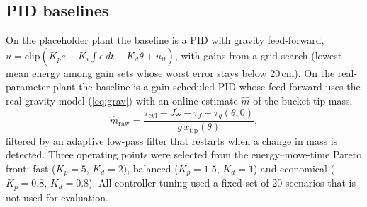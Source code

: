 \subsection{PID baselines}
\label{sec:baselines}
On the placeholder plant the baseline is a PID with gravity feed-forward,
$u=\mathrm{clip}(K_p e + K_i\!\int\! e\,dt - K_d\dot\theta + u_\mathrm{ff})$, with gains from a grid
search (lowest mean energy among gain sets whose worst error stays below 20\,cm).
On the real-parameter plant the baseline is a gain-scheduled PID whose feed-forward uses the
real gravity model (\ref{eq:grav}) with an online estimate $\hat m$ of the bucket tip mass,
\begin{equation}
\hat m_\mathrm{raw} = \frac{\tau_\mathrm{cyl} - J\dot\omega - \tau_f - \tau_g(\theta,0)}{g\,x_\mathrm{tip}(\theta)},
\label{eq:mhat}
\end{equation}
filtered by an adaptive low-pass filter that restarts when a change in mass is detected.
Three operating points were selected from the energy--move-time Pareto front:
fast ($K_p=5$, $K_d=2$), balanced ($K_p=1.5$, $K_d=1$) and economical ($K_p=0.8$, $K_d=0.8$).
All controller tuning used a fixed set of 20 scenarios that is not used for evaluation.
